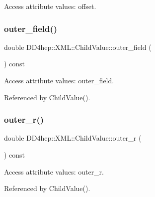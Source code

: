 Access attribute values\+: offset. 

\hypertarget{struct_d_d4hep_1_1_x_m_l_1_1_child_value_aecb871ff92872012aa20706dfcf1a9d3}{}\label{struct_d_d4hep_1_1_x_m_l_1_1_child_value_aecb871ff92872012aa20706dfcf1a9d3} 
\subsubsection{\texorpdfstring{outer\+\_\+field()}{outer\_field()}}
{\footnotesize\ttfamily double D\+D4hep\+::\+X\+M\+L\+::\+Child\+Value\+::outer\+\_\+field (\begin{DoxyParamCaption}{ }\end{DoxyParamCaption}) const}



Access attribute values\+: outer\+\_\+field. 



Referenced by Child\+Value().

\hypertarget{struct_d_d4hep_1_1_x_m_l_1_1_child_value_adeddc36a118a782d7f1b3e0fcaa5cc62}{}\label{struct_d_d4hep_1_1_x_m_l_1_1_child_value_adeddc36a118a782d7f1b3e0fcaa5cc62} 
\subsubsection{\texorpdfstring{outer\+\_\+r()}{outer\_r()}}
{\footnotesize\ttfamily double D\+D4hep\+::\+X\+M\+L\+::\+Child\+Value\+::outer\+\_\+r (\begin{DoxyParamCaption}{ }\end{DoxyParamCaption}) const}



Access attribute values\+: outer\+\_\+r. 



Referenced by Child\+Value().

\hypertarget{struct_d_d4hep_1_1_x_m_l_1_1_child_value_a75e18f3004c75bbb22581645f5d94dd3}{}\label{struct_d_d4hep_1_1_x_m_l_1_1_child_value_a75e18f3004c75bbb22581645f5d94dd3} 
